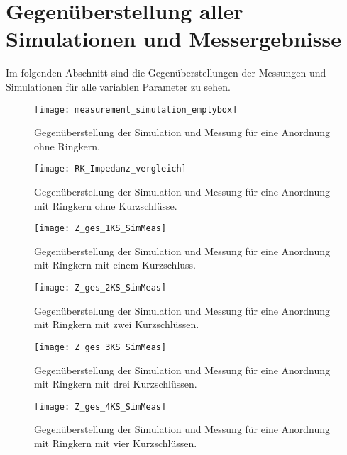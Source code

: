 \section{Gegen\"uberstellung aller Simulationen und Messergebnisse}
\label{sec:simmesskomplett}
Im folgenden Abschnitt sind die Gegen\"uberstellungen der Messungen und Simulationen f\"ur alle variablen Parameter zu sehen.

\begin{figure}[htb]
	\centering
	\texttt{[image: measurement\_simulation\_emptybox]}
	\caption{Gegen\"uberstellung der Simulation und Messung f\"ur eine Anordnung ohne Ringkern.}
	\label{fig:boxpolycrossrkappend}
\end{figure}

\begin{figure}[htb]
	\centering
	\texttt{[image: RK\_Impedanz\_vergleich]}
	\caption{Gegen\"uberstellung der Simulation und Messung f\"ur eine Anordnung mit Ringkern ohne Kurzschl\"usse.}
	\label{fig:boxpolycrossrkappend}
\end{figure}

\begin{figure}[htb]
	\centering
	\texttt{[image: Z\_ges\_1KS\_SimMeas]}
	\caption{Gegen\"uberstellung der Simulation und Messung f\"ur eine Anordnung mit Ringkern mit einem Kurzschluss.}
	\label{fig:boxpolycrossrk1ksappend}
\end{figure}

\begin{figure}[htb]
	\centering
	\texttt{[image: Z\_ges\_2KS\_SimMeas]}
	\caption{Gegen\"uberstellung der Simulation und Messung f\"ur eine Anordnung mit Ringkern mit zwei Kurzschl\"ussen.}
	\label{fig:boxpolycrossrk2ksappend}
\end{figure}

\begin{figure}[htb]
	\centering
	\texttt{[image: Z\_ges\_3KS\_SimMeas]}
	\caption{Gegen\"uberstellung der Simulation und Messung f\"ur eine Anordnung mit Ringkern mit drei Kurzschl\"ussen.}
	\label{fig:boxpolycrossrk3ksappend}
\end{figure}

\begin{figure}[htb]
	\centering
	\texttt{[image: Z\_ges\_4KS\_SimMeas]}
	\caption{Gegen\"uberstellung der Simulation und Messung f\"ur eine Anordnung mit Ringkern mit vier Kurzschl\"ussen.}
	\label{fig:boxpolycrossrk4ksappend}
\end{figure}

